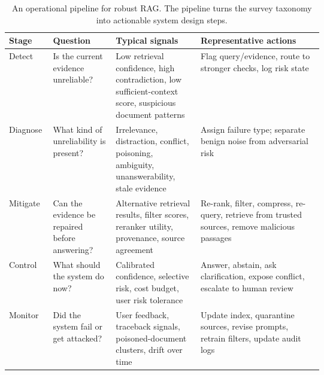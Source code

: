 \begin{table}[t]
\centering
\small
\begin{tabularx}{\linewidth}{p{0.14\linewidth}p{0.2\linewidth}p{0.27\linewidth}X}
\toprule
\textbf{Stage} & \textbf{Question} & \textbf{Typical signals} & \textbf{Representative actions} \\
\midrule
Detect & Is the current evidence unreliable? & Low retrieval confidence, high contradiction, low sufficient-context score, suspicious document patterns & Flag query/evidence, route to stronger checks, log risk state \\
Diagnose & What kind of unreliability is present? & Irrelevance, distraction, conflict, poisoning, ambiguity, unanswerability, stale evidence & Assign failure type; separate benign noise from adversarial risk \\
Mitigate & Can the evidence be repaired before answering? & Alternative retrieval results, filter scores, reranker utility, provenance, source agreement & Re-rank, filter, compress, re-query, retrieve from trusted sources, remove malicious passages \\
Control & What should the system do now? & Calibrated confidence, selective risk, cost budget, user risk tolerance & Answer, abstain, ask clarification, expose conflict, escalate to human review \\
Monitor & Did the system fail or get attacked? & User feedback, traceback signals, poisoned-document clusters, drift over time & Update index, quarantine sources, revise prompts, retrain filters, update audit logs \\
\bottomrule
\end{tabularx}
\caption{An operational pipeline for robust RAG. The pipeline turns the survey taxonomy into actionable system design steps.}
\label{tab:operational-pipeline}
\end{table}

